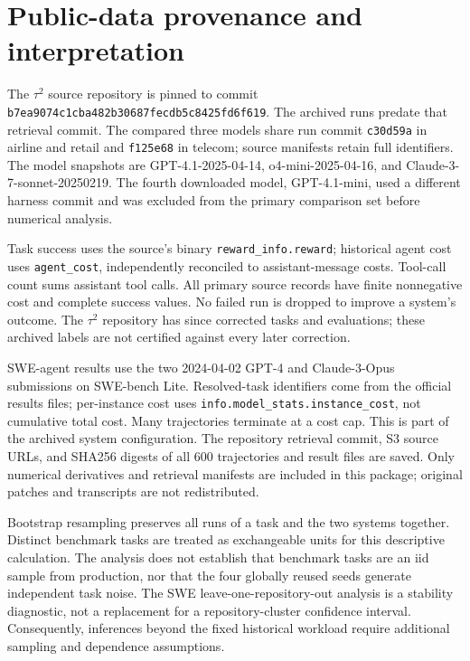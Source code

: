 \section{Public-data provenance and interpretation}
The $\tau^2$ source repository is pinned to commit
\texttt{b7ea9074c1cba482b30687fecdb5c8425fd6f619}.
The archived runs predate that retrieval commit. The compared three
models share run commit \texttt{c30d59a} in airline and retail and
\texttt{f125e68} in telecom; source manifests retain full identifiers.
The model snapshots are GPT-4.1-2025-04-14, o4-mini-2025-04-16,
and Claude-3-7-sonnet-20250219. The fourth downloaded model,
GPT-4.1-mini, used a different harness commit and was excluded from
the primary comparison set before numerical analysis.

Task success uses the source's binary \texttt{reward\_info.reward};
historical agent cost uses \texttt{agent\_cost}, independently reconciled
to assistant-message costs. Tool-call count sums assistant tool calls.
All primary source records have finite nonnegative cost and complete
success values. No failed run is dropped to improve a system's outcome.
The $\tau^2$ repository has since corrected tasks and evaluations; these
archived labels are not certified against every later correction.

SWE-agent results use the two 2024-04-02 GPT-4 and Claude-3-Opus
submissions on SWE-bench Lite. Resolved-task identifiers come from the
official results files; per-instance cost uses
\texttt{info.model\_stats.instance\_cost}, not cumulative total cost.
Many trajectories terminate at a cost cap. This is part of the archived
system configuration. The repository retrieval commit, S3 source URLs,
and SHA256 digests of all 600 trajectories and result files are saved.
Only numerical derivatives and retrieval manifests are included in this
package; original patches and transcripts are not redistributed.

Bootstrap resampling preserves all runs of a task and the two systems
together. Distinct benchmark tasks are treated as exchangeable units for
this descriptive calculation. The analysis does not establish that
benchmark tasks are an iid sample from production, nor that the four
globally reused seeds generate independent task noise. The SWE
leave-one-repository-out analysis is a stability diagnostic, not a
replacement for a repository-cluster confidence interval. Consequently,
inferences beyond the fixed historical workload require additional
sampling and dependence assumptions.

